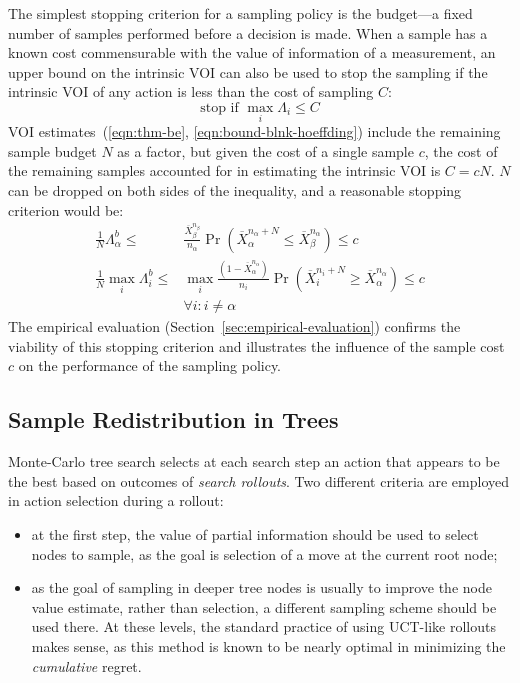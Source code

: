 \documentclass[]{article}
\begin{document}
The simplest stopping criterion for a sampling policy is the
budget---a fixed number of samples performed before a decision is
made. When a sample has a known cost commensurable with the value of
information of a measurement, an upper bound on the intrinsic VOI can also
be used to stop the sampling if the intrinsic VOI of any action
is less than the cost of sampling $C$:
\begin{equation}
\mbox{stop if } \max_i \Lambda_i \le C
\end{equation}
VOI estimates~(\ref{eqn:thm-be},
\ref{eqn:bound-blnk-hoeffding}) include the remaining sample budget $N$ as a
factor, but given the cost of a single sample $c$, the cost of the
remaining samples accounted for in estimating the intrinsic VOI is
$C=cN$. $N$ can be dropped on both sides of the inequality,
and a reasonable stopping criterion would be:
\begin{align}
\frac 1 N \Lambda_\alpha^b \le&\frac {\overline X_\beta^{n_\beta}}
  {n_\alpha}\Pr(\overline X_\alpha^{n_\alpha+N}\le\overline
  X_\beta^{n_\alpha})\le c\nonumber\\
\frac 1 N \max_i\Lambda_i^b\le &\max_i\frac {(1-\overline X_\alpha^{n_\alpha})} {n_i}\Pr(\overline
  X_i^{n_i+N}\ge\overline X_\alpha^{n_\alpha})\le c\nonumber\\
    &\forall i: i\ne\alpha
\label{eqn:stopping-blnk}
\end{align}
The empirical evaluation (Section~\ref{sec:empirical-evaluation})
confirms the viability of this stopping criterion and illustrates the
influence of the sample cost $c$ on the performance of
the sampling policy.

\subsection{Sample Redistribution in Trees}
\label{sec:control-redistribution}

Monte-Carlo tree search \cite{Chaslot.montecarlo} selects at each
search step an action that appears to be the best based on outcomes
of \textit{search rollouts}. Two different criteria are employed in
action selection during a rollout:
\begin{itemize}
\item at the first step, the value of partial
information should be used to select nodes to sample, as the goal is
selection of a move at the current root node;
\item as the goal of sampling in deeper tree nodes is usually to improve the
node value estimate, rather than selection, a different sampling scheme
should be used there. At these levels, the standard practice
of using UCT-like rollouts makes sense, as this method is known to be nearly optimal
in minimizing the \textit{cumulative} regret.
\end{itemize}
\end{document}
